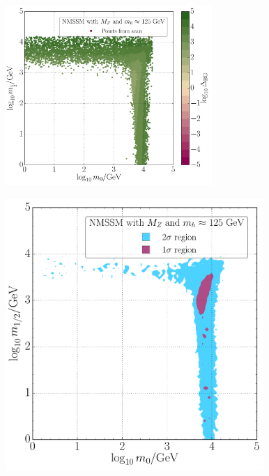 \documentclass[10pt,aspectratio=169]{beamer}
\begin{document}
\begin{frame}
\begin{columns}[t]
\begin{column}{0.7\textwidth}
\begin{columns}[t]
\begin{column}{0.5\textwidth}
\begin{figure}
          \end{figure}
        \end{column}
        \begin{column}{0.5\textwidth}
          \vspace{-35pt}
          \begin{figure}
            \centering
            \includegraphics[width=0.8\textwidth]{CNMSSM_BG_mh_m0m12}
          \end{figure}
          \vspace{-20pt}
          \begin{figure}
            \centering
            \includegraphics[height=0.7\textwidth]{CNMSSM_pdf_mz_mh_m0m12}
          \end{figure}
        \end{column}
      \end{columns}

\end{column}
\end{columns}
\end{frame}
\end{document}

